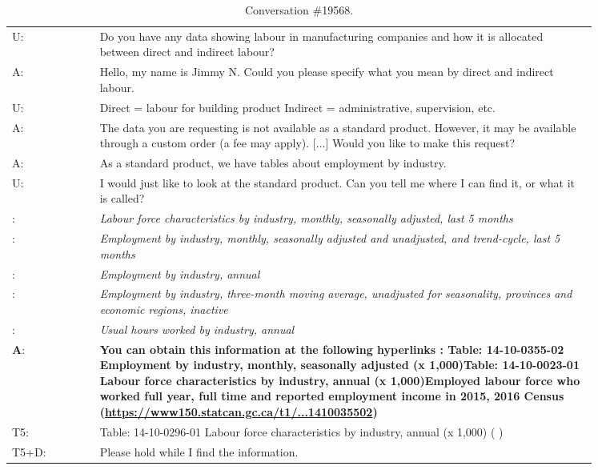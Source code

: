 \documentclass[11pt]{article}
\begin{document}
\begin{table*}[h]
    \small
    \centering
    \begin{tabular}{l p{0.85\linewidth}}
        \toprule
        U: & Do you have any data showing labour in manufacturing companies and how it is allocated between direct and indirect labour? 
        \\
        A: & Hello, my name is Jimmy N. Could you please specify what you mean by direct and indirect labour. 
        \\
        U: & Direct = labour for building product Indirect = administrative, supervision, etc. 
        \\
        A: & The data you are requesting is not available as a standard product. However, it may be available through a custom order (a fee may apply). [...] Would you like to make this request? 
        \\
        A: & As a standard product, we have tables about employment by industry.
        \\
        U: & I would just like to look at the standard product. Can you tell me where I can find it, or what it is called?\
        \\
        : & \textit{Labour force characteristics by industry, monthly, seasonally adjusted, last 5 months}
        \\
        : & \textit{Employment by industry, monthly, seasonally adjusted and unadjusted, and trend-cycle, last 5 months}
        \\
        : & \textit{Employment by industry, annual}
        \\
        : & \textit{Employment by industry, three-month moving average, unadjusted for seasonality, provinces and economic regions, inactive}
        \\
        : & \textit{Usual hours worked by industry, annual}
        \\
        \midrule
        \textbf{A}: & \textbf{You can obtain this information at the following hyperlinks : Table: 14-10-0355-02 Employment by industry, monthly, seasonally adjusted (x 1,000)Table: 14-10-0023-01 Labour force characteristics by industry, annual (x 1,000)Employed labour force who worked full year, full time and reported employment income in 2015, 2016 Census (\href{https://www150.statcan.gc.ca/t1/tbl1/en/tv.action?pid=1410035502}{https://www150.statcan.gc.ca/t1/...1410035502})}
        \\
        T5: & Table: 14-10-0296-01 Labour force characteristics by industry, annual (x 1,000) ( )
        \\
        T5+D: & Please hold while I find the information.
        \\
        \bottomrule
    \end{tabular}
    \caption{Conversation \#19568.}
    \label{tab:sample_conversation_19568}
\end{table*}
\end{document}
